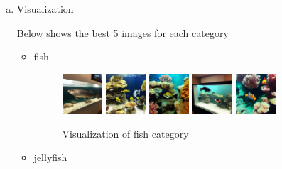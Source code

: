 \documentclass[10pt,a4paper]{article}
\begin{document}
\begin{enumerate}[(a)]
\item Visualization

Below shows the best 5 images for each category
\begin{itemize}
\item fish

\begin{figure}[H]
\centering
\includegraphics[width=0.15\textwidth]{figure/fish_IMG_2382_jpeg_jpg.rf.b431ad0ed94761ef82281dbe844170cc.jpg_gligen.jpg}
\label{fig:IMG_2382}
\includegraphics[width=0.15\textwidth]{figure/fish_IMG_2394_jpeg_jpg.rf.3994f29b2f24a3104ed3404617128485.jpg_gligen.jpg}
\label{fig:IMG_2394}
\includegraphics[width=0.15\textwidth]{figure/fish_IMG_2406_jpeg_jpg.rf.1188b08782ffbc29af95b22721ca6015.jpg_gligen.jpg}
\label{fig:IMG_2406}
\includegraphics[width=0.15\textwidth]{figure/fish_IMG_2520_jpeg_jpg.rf.4cab9c74da59c93865ed205f4dcf8c46.jpg_gligen.jpg}
\label{fig:IMG_2520}
\includegraphics[width=0.15\textwidth]{figure/fish_IMG_8549_jpg.rf.ee5f8f7fa2cae6f1e528e1b350ad4046.jpg_gligen.jpg}
\label{fig:IMG_8549}
\caption{Visualization of fish category}
\end{figure}

\item jellyfish


\end{itemize}
\end{enumerate}
\end{document}
